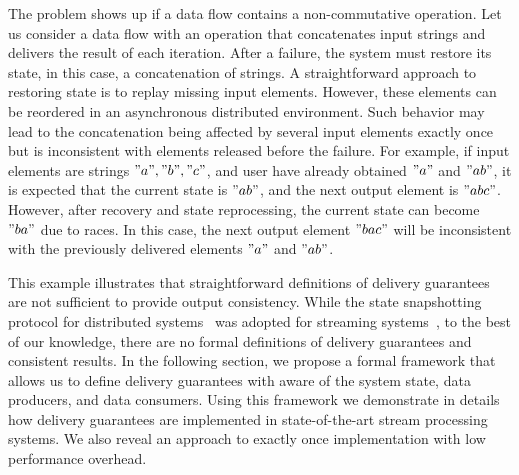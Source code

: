 The problem shows up if a data flow contains a non-commutative operation. Let us consider a data flow with an operation that concatenates input strings and delivers the result of each iteration. After a failure, the system must restore its state, in this case, a concatenation of strings. A straightforward approach to restoring state is to replay missing input elements. However, these elements can be reordered in an asynchronous distributed environment. Such behavior may lead to the concatenation being affected by several input elements exactly once but is inconsistent with elements released before the failure. For example, if input elements are strings $"a","b","c"$, and user have already obtained $"a"$ and $"ab"$, it is expected that the current state is $"ab"$, and the next output element is $"abc"$. However, after recovery and state reprocessing, the current state can become $"ba"$ due to races. In this case, the next output element $"bac"$ will be inconsistent with the previously delivered elements $"a"$ and $"ab"$.  

This example illustrates that straightforward definitions of delivery guarantees are not sufficient to provide output consistency. While the state snapshotting protocol for distributed systems~\cite{Chandy:1985:DSD:214451.214456} was adopted for streaming systems~\cite{2015arXiv150608603C}, to the best of our knowledge, there are no formal definitions of delivery guarantees and consistent results. In the following section, we propose a formal framework that allows us to define delivery guarantees with aware of the system state, data producers, and data consumers. Using this framework we demonstrate in details how delivery guarantees are implemented in state-of-the-art stream processing systems. We also reveal an approach to exactly once implementation with low performance overhead. 